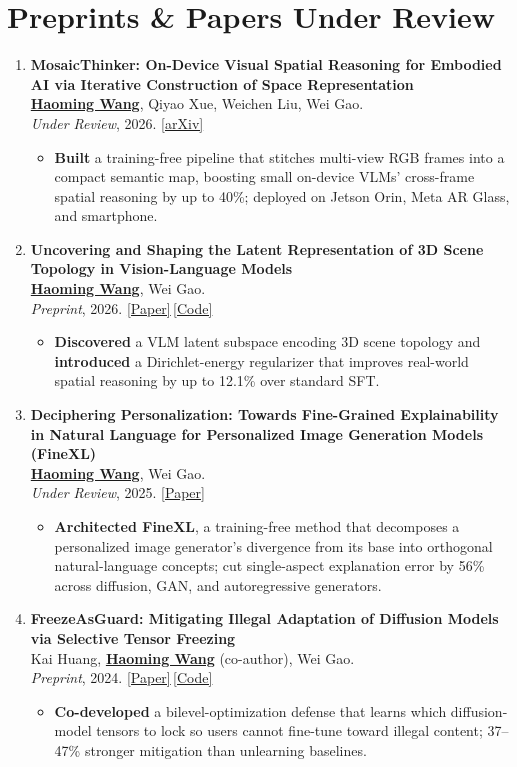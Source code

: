\documentclass[11pt, letterpaper]{article}
\newenvironment{publist}{
  \begin{enumerate}[leftmargin=1.7em, itemsep=4pt, parsep=0pt, topsep=2pt, label=\arabic*.]
}{\end{enumerate}}
\newcommand{\impactbullet}[1]{%
  \par\vspace{1pt}%
  \begin{itemize}[leftmargin=1.2em, topsep=0pt, itemsep=0pt, parsep=0pt, partopsep=0pt]
    \item #1
  \end{itemize}}
\newcommand{\me}{\underline{\textbf{Haoming Wang}}}
\newcommand{\meco}{\underline{\textbf{Haoming Wang}} (co-author)}
\begin{document}
\section{Preprints \& Papers Under Review}

\begin{publist}
\item \textbf{MosaicThinker: On-Device Visual Spatial Reasoning for Embodied AI via Iterative Construction of Space Representation}\\
\me, Qiyao Xue, Weichen Liu, Wei Gao.\\
\textit{Under Review}, 2026. \href{https://www.arxiv.org/abs/2602.07082}{[arXiv]}
\impactbullet{\textbf{Built} a training-free pipeline that stitches multi-view RGB frames into a compact semantic map, boosting small on-device VLMs' cross-frame spatial reasoning by up to 40\%; deployed on Jetson Orin, Meta AR Glass, and smartphone.}

\item \textbf{Uncovering and Shaping the Latent Representation of 3D Scene Topology in Vision-Language Models}\\
\me, Wei Gao.\\
\textit{Preprint}, 2026. \href{https://haomingwang645.github.io/pdfs/arxiv26_vlm_latent_shaping.pdf}{[Paper]}\,\href{https://github.com/pittisl/vlm-latent-shaping}{[Code]}
\impactbullet{\textbf{Discovered} a VLM latent subspace encoding 3D scene topology and \textbf{introduced} a Dirichlet-energy regularizer that improves real-world spatial reasoning by up to 12.1\% over standard SFT.}

\item \textbf{Deciphering Personalization: Towards Fine-Grained Explainability in Natural Language for Personalized Image Generation Models (FineXL)}\\
\me, Wei Gao.\\
\textit{Under Review}, 2025. \href{https://haomingwang645.github.io/pdfs/finexl_paper.pdf}{[Paper]}
\impactbullet{\textbf{Architected FineXL}, a training-free method that decomposes a personalized image generator's divergence from its base into orthogonal natural-language concepts; cut single-aspect explanation error by 56\% across diffusion, GAN, and autoregressive generators.}

\item \textbf{FreezeAsGuard: Mitigating Illegal Adaptation of Diffusion Models via Selective Tensor Freezing}\\
Kai Huang, \meco, Wei Gao.\\
\textit{Preprint}, 2024. \href{https://haomingwang645.github.io/pdfs/freezeasguard_paper.pdf}{[Paper]}\,\href{https://github.com/pittisl/FreezeAsGuard}{[Code]}
\impactbullet{\textbf{Co-developed} a bilevel-optimization defense that learns which diffusion-model tensors to lock so users cannot fine-tune toward illegal content; 37--47\% stronger mitigation than unlearning baselines.}


\end{publist}
\end{document}
